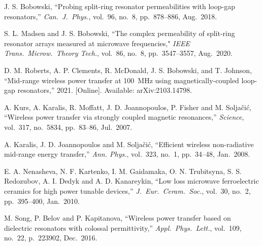 \documentclass[conference]{IEEEtran}
\begin{document}
\begin{thebibliography}{00}
J. S. Bobowski, ``Probing split-ring resonator permeabilities with loop-gap resonators,'' {\it Can.\ J.\ Phys.}, vol.~96, no.~8, pp.~878--886, Aug.~2018.

S. L. Madsen and J. S. Bobowski, ``The complex permeability of split-ring resonator arrays measured at microwave frequencies," {\it IEEE Trans.\ Microw.\ Theory Tech.}, vol.~86, no.~8, pp.~3547--3557, Aug.~2020.

D. M. Roberts, A. P. Clements, R. McDonald, J. S. Bobowski, and T. Johnson, ``Mid-range wireless power transfer at \SI{100}{\mega\hertz} using magnetically-coupled loop-gap resonators,'' 2021. [Online]. Available: arXiv:2103.14798.

A. Kurs, A. Karalis, R. Moffatt, J. D. Joannopoulos, P. Fisher and M. Solja\v{c}i\'{c}, ``Wireless power transfer via strongly coupled magnetic resonances,'' {\it Science}, vol.~317, no.~5834, pp.~83--86, Jul.~2007.

A. Karalis, J. D. Joannopoulos and M. Solja\v{c}i\'{c}, ``Efficient wireless non-radiative mid-range energy transfer,'' {\it Ann. Phys.}, vol.~323, no.~1, pp.~34--48, Jan.~2008.

E. A. Nenasheva, N. F. Kartenko, I. M. Gaidamaka, O. N. Trubitsyna, S. S. Redozubov, A. I. Dedyk and A. D. Kanareykin, ``Low loss microwave ferroelectric ceramics for high power tunable devices,'' {\it J.\ Eur.\ Ceram.\ Soc.}, vol.~30, no.~2, pp.~395--400, Jan.~2010.

M. Song, P. Belov and P. Kapitanova, ``Wireless power transfer based on dielectric resonators with colossal permittivity,'' {\it Appl.\ Phys.\ Lett.}, vol.~109, no.~22, p.~223902, Dec.~2016.

\end{thebibliography}
\end{document}
